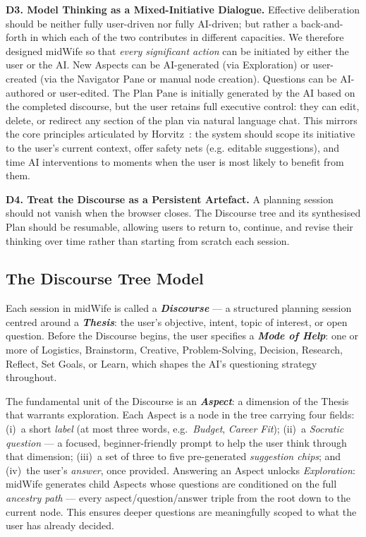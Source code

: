 \documentclass[sigconf]{acmart}
\begin{document}
\textbf{D3. Model Thinking as a Mixed-Initiative Dialogue.}
Effective deliberation should be neither fully user-driven nor fully AI-driven; but rather a
back-and-forth in which each of the two contributes in different capacities.
We therefore designed midWife so that \textit{every significant action} can be initiated
by either the user or the AI. New Aspects can be AI-generated (via Exploration) or
user-created (via the Navigator Pane or manual node creation). Questions can be
AI-authored or user-edited. The Plan Pane is initially generated by the AI based
on the completed discourse, but the user retains full executive control: they can edit,
delete, or redirect any section of the plan via natural language chat. This mirrors
the core principles articulated by Horvitz~\cite{horvitz1999mixedinitiative}: the
system should scope its initiative to the user's current context, offer safety nets
(e.g. editable suggestions), and time AI interventions to moments when the user is
most likely to benefit from them.

\textbf{D4. Treat the Discourse as a Persistent Artefact.}
A planning session should not vanish when the browser closes. The Discourse tree and
its synthesised Plan should be resumable, allowing users to return to, continue, and
revise their thinking over time rather than starting from scratch each session.

\subsection{The Discourse Tree Model}
Each session in midWife is called a \textbf{\textit{Discourse}} --- a structured
planning session centred around a \textbf{\textit{Thesis}}: the user's objective,
intent, topic of interest, or open question. Before the Discourse begins, the user
specifies a \textbf{\textit{Mode of Help}}: one or more of Logistics, Brainstorm,
Creative, Problem-Solving, Decision, Research, Reflect, Set Goals, or Learn, which
shapes the AI's questioning strategy throughout.

The fundamental unit of the Discourse is an \textbf{\textit{Aspect}}: a dimension of
the Thesis that warrants exploration. Each Aspect is a node in the tree carrying four
fields: (i)~a short \textit{label} (at most three words, e.g.\ \textit{Budget},
\textit{Career Fit}); (ii)~a \textit{Socratic question} --- a focused,
beginner-friendly prompt to help the user think through that dimension; (iii)~a set
of three to five pre-generated \textit{suggestion chips}; and (iv)~the user's
\textit{answer}, once provided. Answering an Aspect unlocks \textit{Exploration}:
midWife generates child Aspects whose questions are conditioned on the full
\textit{ancestry path} --- every aspect/question/answer triple from the root down to
the current node. This ensures deeper questions are meaningfully scoped to what the
user has already decided.
\end{document}
